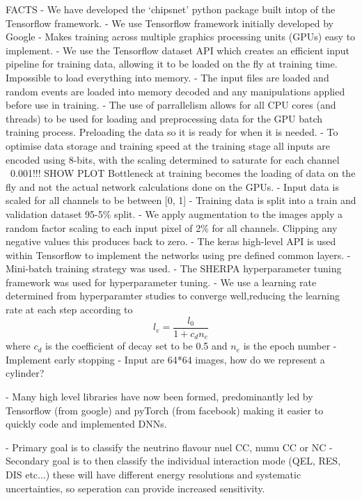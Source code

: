 FACTS
- We have developed the `chipsnet' python package built intop of the Tensorflow framework.
- We use Tensorflow framework initially developed by Google
- Makes training across multiple graphics processing units (GPUs) easy to implement.
- We use the Tensorflow dataset API which creates an efficient input pipeline for training data,
allowing it to be loaded on the fly at training time. Impossible to load everything into memory.
- The input files are loaded and random events are loaded into memory decoded and any
manipulations applied before use in training.
- The use of parrallelism allows for all CPU cores (and threads) to be used for loading and
preprocessing data for the GPU batch training process. Preloading the data so it is ready for when
it is needed.
- To optimise data storage and training speed at the training stage all inputs are encoded using
8-bits, with the scaling determined to saturate for each channel ~0.001!!! SHOW PLOT Bottleneck at
training becomes the loading of data on the fly and not the actual network calculations done on
the GPUs.
- Input data is scaled for all channels to be between [0, 1]
- Training data is split into a train and validation dataset 95-5\% split.
- We apply augmentation to the images apply a random factor scaling to each input pixel of
2\% for all channels. Clipping any negative values this produces back to zero.
- The keras high-level API is used within Tensorflow to implement the networks using pre defined
common layers.
- Mini-batch training strategy was used.
- The SHERPA hyperparameter tuning framework was used for hyperparameter tuning.
- We use a learning rate determined from hyperparamter studies to converge well,reducing the
learning rate at each step according to
\begin{equation}
    l_{e}=\frac{l_{0}}{1+c_{d}n_{e}}
\end{equation}
where $c_{d}$ is the coefficient of decay set to be 0.5 and $n_{e}$ is the epoch number
- Implement early stopping
- Input are 64*64 images, how do we represent a cylinder?

- Many high level libraries have now been formed, predominantly led by Tensorflow (from google)
and pyTorch (from facebook) making it easier to quickly code and implemented DNNs.

- Primary goal is to classify the neutrino flavour nuel CC, numu CC or NC
- Secondary goal is to then classify the individual interaction mode (QEL, RES, DIS etc...) these
will have different energy resolutions and systematic uncertainties, so seperation can provide
increased sensitivity.

